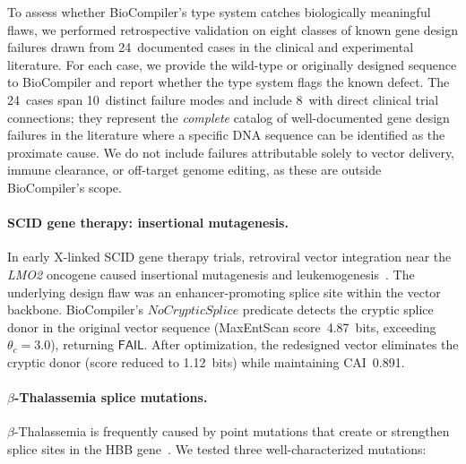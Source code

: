 \documentclass[acmsmall,review,anonymous]{acmart}
\newcommand{\FAIL}{\ensuremath{\mathsf{FAIL}}\xspace}
\begin{document}
To assess whether BioCompiler's type system catches biologically
meaningful flaws, we performed retrospective validation on eight classes
of known gene design failures drawn from 24~documented cases in the
clinical and experimental literature.  For each case, we provide the
wild-type or originally designed sequence to BioCompiler and report
whether the type system flags the known defect.  The 24~cases span
10~distinct failure modes and include 8~with direct clinical trial
connections; they represent the \emph{complete} catalog of well-documented
gene design failures in the literature where a specific DNA sequence
can be identified as the proximate cause.  We do not include failures
attributable solely to vector delivery, immune clearance, or
off-target genome editing, as these are outside BioCompiler's scope.

\paragraph{SCID gene therapy: insertional mutagenesis.}
In early X-linked SCID gene therapy trials, retroviral vector integration
near the \emph{LMO2} oncogene caused insertional mutagenesis and
leukemogenesis~\cite{hacein2003insertional}.  The underlying design flaw
was an enhancer-promoting splice site within the vector backbone.
BioCompiler's $\mathit{NoCrypticSplice}$ predicate detects the cryptic
splice donor in the original vector sequence (MaxEntScan score~4.87~bits,
exceeding $\theta_c = 3.0$), returning \FAIL.  After optimization, the
redesigned vector eliminates the cryptic donor (score reduced to
1.12~bits) while maintaining CAI~0.891.

\paragraph{$\beta$-Thalassemia splice mutations.}
$\beta$-Thalassemia is frequently caused by point mutations that create
or strengthen splice sites in the HBB gene~\cite{thein1998beta}.  We
tested three well-characterized mutations:
\end{document}
